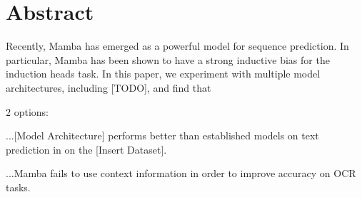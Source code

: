 \section{Abstract}
Recently, Mamba has emerged as a powerful model for sequence prediction.
In particular, Mamba has been shown to have a strong inductive bias for the
induction heads task. In this paper, we experiment with multiple model
architectures, including [TODO], and find that

2 options:

...[Model Architecture] performs better than established models on text
prediction in on the [Insert Dataset].

...Mamba fails to use context information in order to improve accuracy on OCR
tasks.